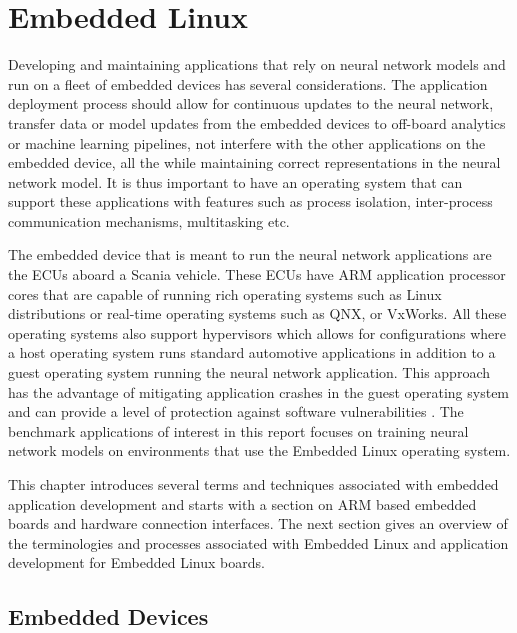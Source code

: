 
\chapter{Embedded Linux}

Developing and maintaining applications that rely on neural network models and run on a fleet of embedded devices has several considerations. The application deployment process should allow for continuous updates to the neural network, transfer data or model updates from the embedded devices to off-board analytics or machine learning pipelines, not interfere with the other applications on the embedded device, all the while maintaining correct representations in the neural network model. It is thus important to have an operating system that can support these applications with features such as process isolation, inter-process communication mechanisms, multitasking etc.

The embedded device that is meant to run the neural network applications are the ECUs aboard a Scania vehicle. These ECUs have ARM application processor cores that are capable of running rich operating systems such as Linux distributions or real-time operating systems such as QNX, or VxWorks. All these operating systems also support hypervisors which allows for configurations where a host operating system runs standard automotive applications in addition to a guest operating system running the neural network application. This approach has the advantage of mitigating application crashes in the guest operating system and can provide a level of protection against software vulnerabilities \cite{Linux-guest-os}. The benchmark applications of interest in this report focuses on training neural network models on environments that use the Embedded Linux operating system.

This chapter introduces several terms and techniques associated with embedded application development and starts with a section on ARM based embedded boards and hardware connection interfaces. The next section gives an overview of the terminologies and processes associated with Embedded Linux and application development for Embedded Linux boards.

\section{Embedded Devices}

